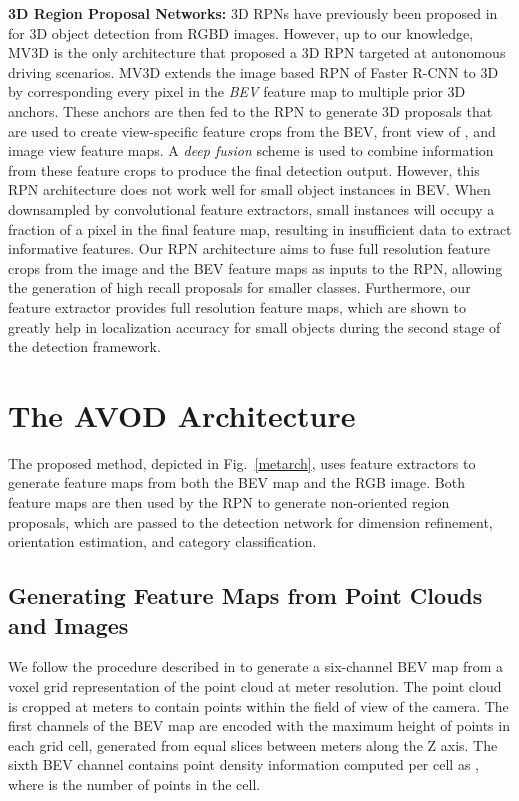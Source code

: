 \documentclass[letterpaper, 10 pt, conference]{ieeeconf}
\newcommand{\fig}[1]{Fig.~\ref{#1}}
\begin{document}
\noindent \textbf{3D Region Proposal Networks:}
3D RPNs have previously been proposed in \cite{song2016deep} for 3D object detection from RGBD images. However, up to our knowledge, MV3D \cite{cvpr17chen} is the only architecture that proposed a 3D RPN targeted at autonomous driving scenarios. MV3D extends the image based RPN of Faster R-CNN \cite{ren2015faster} to 3D by corresponding every pixel in the \textit{BEV} feature map to multiple prior 3D anchors. These anchors are then fed to the RPN to generate 3D proposals that are used to create view-specific feature crops from the BEV, front view of \cite{Li-RSS-16}, and image view feature maps. A \textit{deep fusion} scheme is used to combine information from these feature crops to produce the final detection output. However, this RPN architecture does not work well for small object instances in BEV. When downsampled by convolutional feature extractors, small instances will occupy a fraction of a pixel in the final feature map, resulting in insufficient data to extract informative features. Our RPN architecture aims to fuse full resolution feature crops from the image and the BEV feature maps as inputs to the RPN, allowing the generation of high recall proposals for smaller classes. Furthermore, our feature extractor provides full resolution feature maps, which are shown to greatly help in localization accuracy for small objects during the second stage of the detection framework.
\section{The AVOD Architecture}
\label{meta}
The proposed method, depicted in \fig{metarch}, uses feature extractors to generate feature maps from both the BEV map and the RGB image. Both feature maps are then used by the RPN to generate non-oriented region proposals, which are passed to the detection network for dimension refinement, orientation estimation, and category classification.

\subsection{Generating Feature Maps from Point Clouds and Images}
We follow the procedure described in \cite{cvpr17chen} to generate a six-channel BEV map from a voxel grid representation of the point cloud at  meter resolution. The point cloud is cropped at  meters to contain points within the field of view of the camera. The first  channels of the BEV map are encoded with the maximum height of points in each grid cell, generated from  equal slices between  meters along the Z axis. The sixth BEV channel contains point density information computed per cell as , where  is the number of points in the cell.
\end{document}
